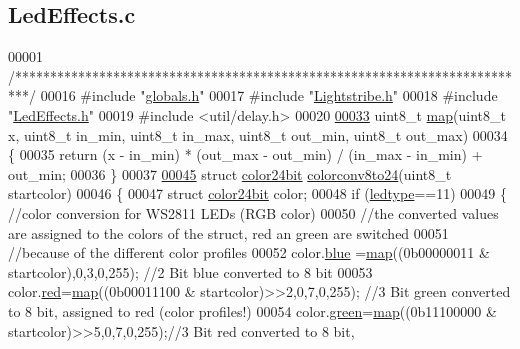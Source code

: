 \hypertarget{_led_effects_8c_source}{}\subsection{Led\+Effects.\+c}

\begin{DoxyCode}
00001 \textcolor{comment}{/**************************************************************************/}
00016 \textcolor{preprocessor}{#include "\hyperlink{globals_8h}{globals.h}"}
00017 \textcolor{preprocessor}{#include "\hyperlink{_lightstribe_8h}{Lightstribe.h}"}
00018 \textcolor{preprocessor}{#include "\hyperlink{_led_effects_8h}{LedEffects.h}"}
00019 \textcolor{preprocessor}{#include <util/delay.h>}
00020 
\hypertarget{_led_effects_8c_source_l00033}{}\hyperlink{_led_effects_8h_ad67a4e660b5122ed454e101432bbdba0}{00033} uint8\_t \hyperlink{_led_effects_8c_ad67a4e660b5122ed454e101432bbdba0}{map}(uint8\_t x, uint8\_t in\_min, uint8\_t in\_max, uint8\_t out\_min, uint8\_t out\_max)
00034 \{
00035     \textcolor{keywordflow}{return} (x - in\_min) * (out\_max - out\_min) / (in\_max - in\_min) + out\_min;
00036 \}
00037 
\hypertarget{_led_effects_8c_source_l00045}{}\hyperlink{_led_effects_8h_a55291315ab0f2ca8d508f0e9da1920a7}{00045} \textcolor{keyword}{struct }\hyperlink{structcolor24bit}{color24bit} \hyperlink{_led_effects_8c_a55291315ab0f2ca8d508f0e9da1920a7}{colorconv8to24}(uint8\_t startcolor)
00046 \{
00047     \textcolor{keyword}{struct }\hyperlink{structcolor24bit}{color24bit} color;
00048     \textcolor{keywordflow}{if} (\hyperlink{globals_8h_a722e1eb38b661d1338ada3cc7a4049a0}{ledtype}==11)
00049     \{   \textcolor{comment}{//color conversion for WS2811 LEDs (RGB color)}
00050         \textcolor{comment}{//the converted values are assigned to the colors of the struct, red an green are switched}
00051         \textcolor{comment}{//because of the different color profiles}
00052         color.\hyperlink{structcolor24bit_a287b397e90d7b995c81ff54e741f96b2}{blue} =\hyperlink{_led_effects_8c_ad67a4e660b5122ed454e101432bbdba0}{map}((0b00000011 & startcolor),0,3,0,255);    \textcolor{comment}{//2 Bit blue converted to 8 bit}
00053         color.\hyperlink{structcolor24bit_ad47d918910aaa51c73160ac85999d09c}{red}=\hyperlink{_led_effects_8c_ad67a4e660b5122ed454e101432bbdba0}{map}((0b00011100 & startcolor)>>2,0,7,0,255);    \textcolor{comment}{//3 Bit green converted to 8 bit,
       assigned to red (color profiles!)}
00054         color.\hyperlink{structcolor24bit_a90d21fa503b626c00cdc8d94863d5877}{green}=\hyperlink{_led_effects_8c_ad67a4e660b5122ed454e101432bbdba0}{map}((0b11100000 & startcolor)>>5,0,7,0,255);\textcolor{comment}{//3 Bit red converted to 8 bit,
}
\end{DoxyCode}
